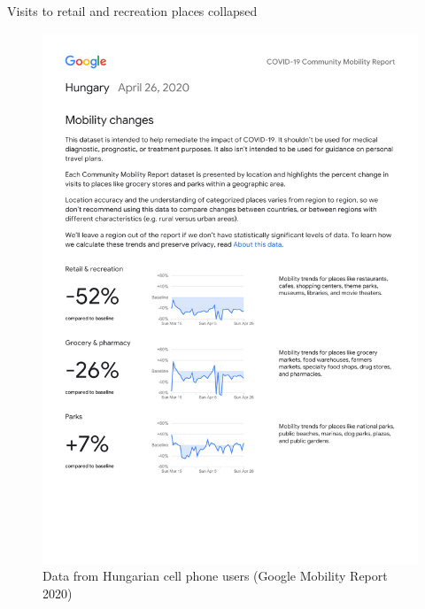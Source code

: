 \documentclass[ignorenonframetext,aspectratio=54,]{beamer}
\begin{document}
\begin{frame}{Visits to retail and recreation places collapsed}
\protect\hypertarget{visits-to-retail-and-recreation-places-collapsed}{}

\begin{figure}
\centering
\includegraphics[width=1\textwidth,height=\textheight]{exhibit/fig/gmr-retail.pdf}
\caption{Data from Hungarian cell phone users (Google Mobility Report
2020)}
\end{figure}

\end{frame}
\end{document}
